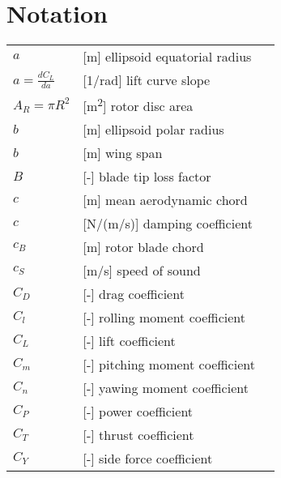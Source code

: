 \clearpage %
{}
\chapter*{Notation}
\markright{}

\begin{longtable}[l]{ l l p{} }
  $a$                                                    & [m] ellipsoid equatorial radius \\
  $a=\frac{dC_L}{da}$                                    & [1/rad] lift curve slope \\
  $A_R=\pi R^2$                                          & [m\textsuperscript{2}] rotor disc area \\
  $b$                                                    & [m] ellipsoid polar radius \\
  $b$                                                    & [m] wing span \\
  $B$                                                    & [-] blade tip loss factor \\
  $c$                                                    & [m] mean aerodynamic chord \\
  $c$                                                    & [N/(m/s)] damping coefficient \\
  $c_B$                                                  & [m] rotor blade chord \\
  $c_S$                                                  & [m/s] speed of sound \\
  $C_D$                                                  & [-] drag coefficient \\
  $C_l$                                                  & [-] rolling moment coefficient \\
  $C_L$                                                  & [-] lift coefficient \\
  $C_m$                                                  & [-] pitching moment coefficient \\
  $C_n$                                                  & [-] yawing moment coefficient \\
  $C_P$                                                  & [-] power coefficient \\
  $C_T$                                                  & [-] thrust coefficient \\
  $C_Y$                                                  & [-] side force coefficient \\

\end{longtable}
